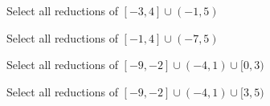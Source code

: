 \documentclass{ximera}
\begin{document}
\begin{exercise}
Select all reductions of $[-3, 4] \cup (-1, 5) $ 

\begin{selectAll}
\choice{$[-3, 5]$}
\choice{$[-3, 4]$}
\choice[correct]{$[-3, 5)$}
\choice{$(-1, 5]$}
\end{selectAll}

\end{exercise}






\begin{exercise}
Select all reductions of $[-1, 4] \cup (-7, 5) $ 

\begin{selectAll}
\choice{$[-1, 5]$}
\choice{$(-7, 4]$}
\choice[correct]{$[-7, 5]$}
\end{selectAll}

\end{exercise}




\begin{exercise}
Select all reductions of $[-9, -2] \cup (-4, 1) \cup [0, 3)$ 

\begin{selectAll}
\choice[correct]{$[-9, 3)$}
\choice{$(-9, 3]$}
\choice{$[-9 , 3]$}
\end{selectAll}

\end{exercise}




\begin{exercise}
Select all reductions of $[-9, -2] \cup (-4, 1) \cup [3, 5)$ 

\begin{selectAll}
\choice{$[-9, 5)$}
\choice{$(-9, 5]$}
\choice[correct]{$[-9 , 1) \cup [3, 5)$}
\choice{$[-9, 1)$}
\end{selectAll}

\end{exercise}
\end{document}
